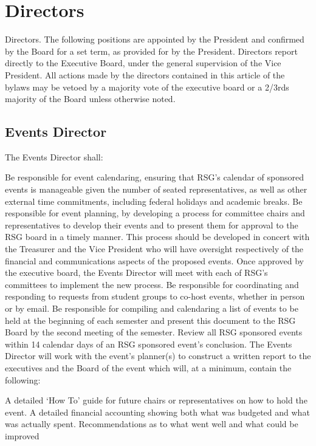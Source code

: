 \chapter{Directors}
Directors. The following positions are appointed by the President and confirmed 
by the Board for a set term, as provided for by the President. Directors report 
directly to the Executive Board, under the general supervision of the Vice President.
All actions made by the directors contained in this article of the bylaws may be 
vetoed by a majority vote of the executive board or a 2/3rds majority of the Board 
unless otherwise noted.
\section{Events Director} The Events Director shall:
\begin{enumsubsection}
\itemnotoc Be responsible for event calendaring, ensuring that RSG's calendar of 
sponsored events is manageable given the number of seated 
representatives, as well as other external time commitments, including 
federal holidays and academic breaks. 
\itemnotoc Be responsible for event planning, by developing a process for committee 
chairs and representatives to develop their events and to present them for 
approval to the RSG board in a timely manner. This process should be 
developed in concert with the Treasurer and the Vice President who will 
have oversight respectively of the financial and communications aspects 
of the proposed events. Once approved by the executive board, the Events Director will meet with each of RSG's committees to implement the 
new process. 
\itemnotoc Be responsible for coordinating and responding to requests from student 
groups to co-host events, whether in person or by email. 
\itemnotoc Be responsible for compiling and calendaring a list of events to be held at 
the beginning of each semester and present this document to the RSG 
Board by the second meeting of the semester.
\itemnotoc Review all RSG sponsored events within 14 calendar days of an RSG 
sponsored event's conclusion. The Events Director will work with the 
event's planner(s) to construct a written report to the executives and the 
Board of the event which will, at a minimum, contain the following:
\begin{enumsubsubsection}
\itemnotoc A detailed `How To' guide for future chairs or representatives on how 
to hold the event.
\itemnotoc A detailed financial accounting showing both what was budgeted and 
what was actually spent.
\itemnotoc Recommendations as to what went well and what could be improved 

\end{enumsubsubsection}
\end{enumsubsection}
